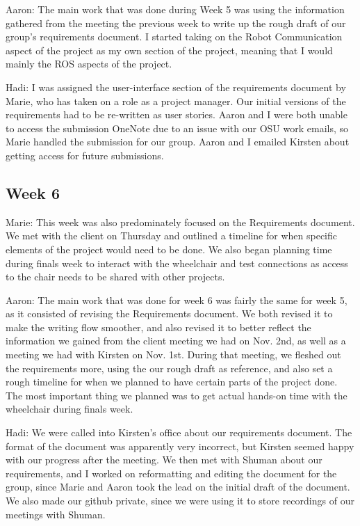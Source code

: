 \documentclass[onecolumn, draftclsnofoot,10pt, compsoc]{IEEEtran}
\begin{document}
Aaron: The main work that was done during Week 5 was using the information gathered from the meeting the previous week to write up the rough draft of our group's requirements document. I started taking on the Robot Communication aspect of the project as my own section of the project, meaning that I would mainly the ROS aspects of the project.\par

Hadi: I was assigned the user-interface section of the requirements document by Marie, who has taken on a role as a project manager. Our initial versions of the requirements had to be re-written as user stories. Aaron and I were both unable to access the submission OneNote due to an issue with our OSU work emails, so Marie handled the submission for our group. Aaron and I emailed Kirsten about getting access for future submissions.\par

\subsection{Week 6}
Marie: This week was also predominately focused on the Requirements document. We met with the client on Thursday and outlined a timeline for when specific elements of the project would need to be done. We also began planning time during finals week to interact with the wheelchair and test connections as access to the chair needs to be shared with other projects.\par

Aaron: The main work that was done for week 6 was fairly the same for week 5, as it consisted of revising the Requirements document. We both revised it to make the writing flow smoother, and also revised it to better reflect the information we gained from the client meeting we had on Nov. 2nd, as well as a meeting we had with Kirsten on Nov. 1st. During that meeting, we fleshed out the requirements more, using the our rough draft as reference, and also set a rough timeline for when we planned to have certain parts of the project done. The most important thing we planned was to get actual hands-on time with the wheelchair during finals week.\par

Hadi: We were called into Kirsten's office about our requirements document. The format of the document was apparently very incorrect, but Kirsten seemed happy with our progress after the meeting. We then met with Shuman about our requirements, and I worked on reformatting and editing the document for the group, since Marie and Aaron took the lead on the initial draft of the document. We also made our github private, since we were using it to store recordings of our meetings with Shuman.\par
\end{document}
